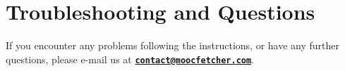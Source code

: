 \documentclass[]{article}
\begin{document}
\section{Troubleshooting and
Questions}\label{troubleshooting-and-questions}

If you encounter any problems following the instructions, or have any
further questions, please e-mail us at
\textbf{\href{mailto:contact@moocfetcher.com}{\nolinkurl{contact@moocfetcher.com}}}.
\end{document}
